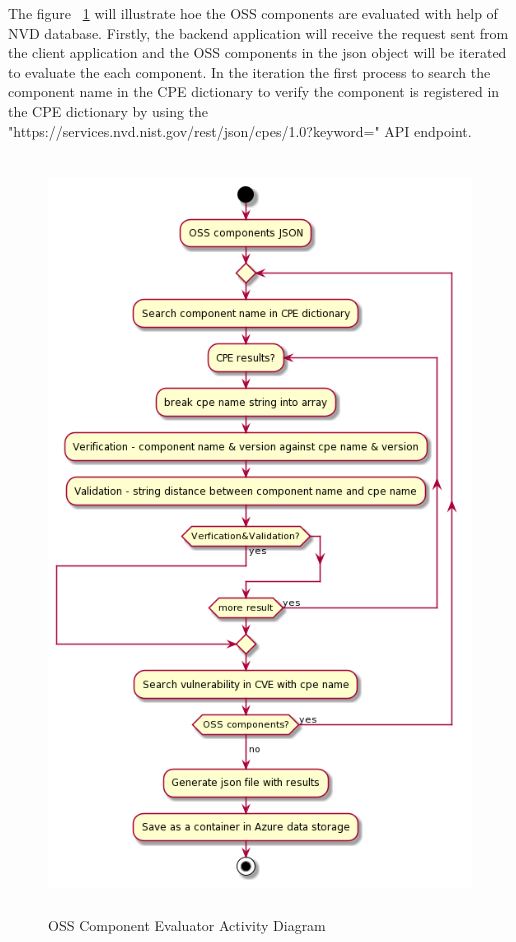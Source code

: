 The figure ~\ref{fig:Evaluator_Activity_Diagram} will illustrate hoe the OSS components are evaluated with help of NVD database. Firstly, the backend application will receive the request sent from the client application and the OSS components in the json object will be iterated to evaluate the each component. In the iteration the first process to search the component name in the CPE dictionary to verify the component is registered in the CPE dictionary by using the "https://services.nvd.nist.gov/rest/json/cpes/1.0?keyword=" API endpoint.   
\newpage 
\begin{figure}[h!]
	\includegraphics[width=15cm,height=20cm]{includes/OSS_Evaluator_Activity_Diagram.png}
	\centering
	\caption{\acs{OSS} Component Evaluator Activity Diagram}
	\label{fig:Evaluator_Activity_Diagram}
\end{figure} 
\newpage                                                                                      \newpage            
